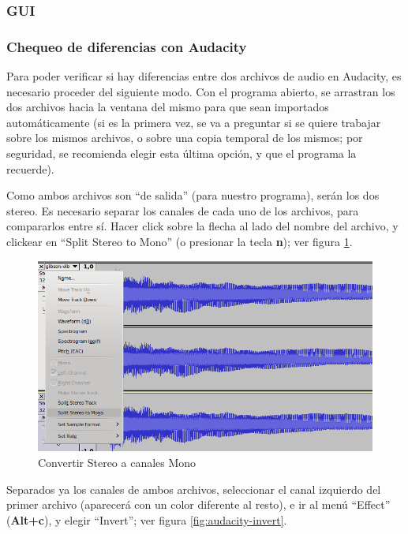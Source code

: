 \documentclass[a4paper,spanish,12pt]{article}
\begin{document}
\newpage\subsubsection{GUI}
\label{subsec:gui}


\newpage\subsubsection{Chequeo de diferencias con Audacity}
\label{subsec:chequeo-diferencias}
Para poder verificar si hay diferencias entre dos archivos de audio en Audacity, es necesario proceder del siguiente modo. Con el programa abierto, se arrastran los dos archivos hacia la ventana del mismo para que sean importados automáticamente (si es la primera vez, se va a preguntar si se quiere trabajar sobre los mismos archivos, o sobre una copia temporal de los mismos; por seguridad, se recomienda elegir esta última opción, y que el programa la recuerde).\vspace{\baselineskip}

Como ambos archivos son ``de salida'' (para nuestro programa), serán los dos stereo. Es necesario separar los canales de cada uno de los archivos, para compararlos entre sí. Hacer click sobre la flecha al lado del nombre del archivo, y clickear en ``Split Stereo to Mono'' (o presionar la tecla \textbf{n}); ver figura \ref{fig:audacity-split-stereo}.

\begin{figure}[H]
    \centering
    \includegraphics[scale=0.70]{imagenes/audacity-split-stereo.png}
    \caption{Convertir Stereo a canales Mono}
    \label{fig:audacity-split-stereo}
\end{figure}


Separados ya los canales de ambos archivos, seleccionar el canal izquierdo del primer archivo (aparecerá con un color diferente al resto), e ir al menú ``Effect'' (\textbf{Alt+c}), y elegir ``Invert''; ver figura \ref{fig:audacity-invert}.\vspace{\baselineskip}
\end{document}
